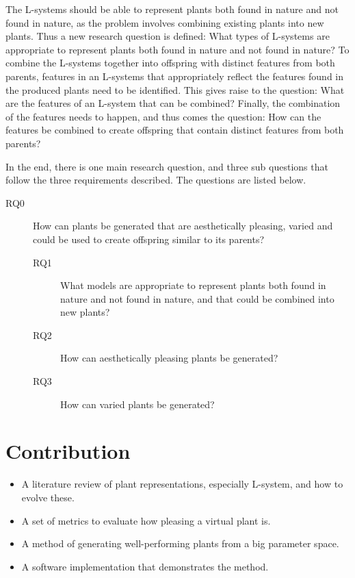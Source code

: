 The L-systems should be able to represent plants both found in nature and not found in nature, as the problem involves combining existing plants into new plants.
Thus a new research question is defined: What types of L-systems are appropriate to represent plants both found in nature and not found in nature?
To combine the L-systems together into offspring with distinct features from both parents, features in an L-systems that appropriately reflect the features found in the produced plants need to be identified.
This gives raise to the question: What are the features of an L-system that can be combined?
Finally, the combination of the features needs to happen, and thus comes the question: How can the features be combined to create offspring that contain distinct features from both parents?

In the end, there is one main research question, and three sub questions that follow the three requirements described.
The questions are listed below.

\begin{description}
    \item[RQ0] How can plants be generated that are aesthetically pleasing, varied and could be used to create offspring similar to its parents?
    \begin{description}
        \item[RQ1] What models are appropriate to represent plants both found in nature and not found in nature, and that could be combined into new plants?
        \item[RQ2] How can aesthetically pleasing plants be generated?
        \item[RQ3] How can varied plants be generated?
    \end{description}
\end{description}

\section{Contribution}
\begin{itemize}
    \item A literature review of plant representations, especially L-system, and how to evolve these.
    \item A set of metrics to evaluate how pleasing a virtual plant is.
    \item A method of generating well-performing plants from a big parameter space.
    \item A software implementation that demonstrates the method.
\end{itemize}
